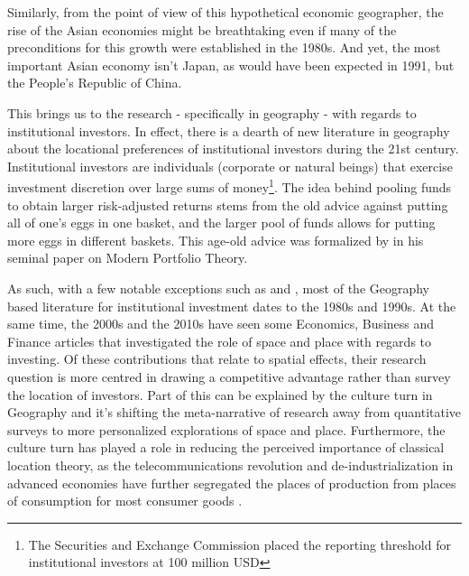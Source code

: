 Similarly, from the point of view of this hypothetical economic geographer, the rise of the Asian economies might be breathtaking even if many of the preconditions for this growth were established in the 1980s.  And yet, the most important Asian economy isn't Japan, as would have been expected in 1991, but the People's Republic of China. 

This brings us to the research - specifically in geography - with regards to institutional investors. In effect, there is a dearth of new literature in geography about the locational preferences of institutional investors during the 21st century. Institutional investors are individuals (corporate or natural beings) that exercise investment discretion over large sums of money\footnote{The Securities and Exchange Commission placed the reporting threshold for institutional investors at 100 million USD}\citep{SEC2013}.  The idea behind pooling funds to obtain larger risk-adjusted returns stems from the old advice against putting all of one's eggs in one basket, and the larger pool of funds allows for putting more eggs in different baskets.  This age-old advice was formalized by \cite{Markowitz1952} in his seminal paper on Modern Portfolio Theory.  


As such, with a few notable exceptions such as \cite{Graves2003,gongthe2012} and \cite{GreenOLef2014}, most of the Geography based literature for institutional investment dates to the 1980s and 1990s.  At the same time, the 2000s and the 2010s have seen some Economics, Business and Finance articles that investigated the role of space and place with regards to investing. Of these contributions that relate to spatial effects, their research question is more centred in drawing a competitive advantage rather than survey the location of investors.  Part of this can be explained by the culture turn in Geography and it's shifting the meta-narrative of research away from quantitative surveys to more personalized explorations of space and place.  Furthermore, the culture turn has played a role in reducing the perceived importance of classical location theory, as the telecommunications revolution and de-industrialization in advanced economies have further segregated the places of production from places of consumption for most consumer goods \citep{bryson1999economic}.    

